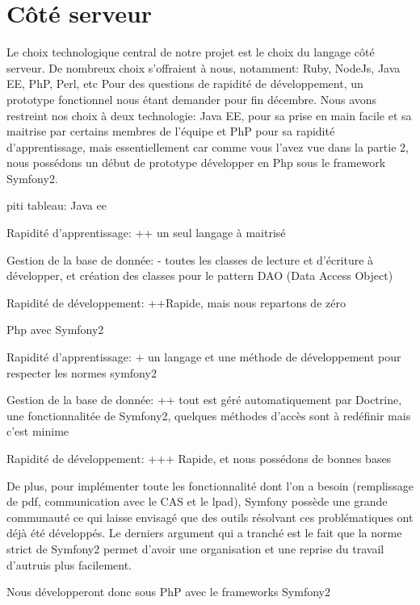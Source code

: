 \section{Côté serveur}
Le choix technologique central de notre projet est le choix du langage côté serveur. De nombreux choix s'offraient à nous, notamment: Ruby, NodeJs, Java EE, PhP, Perl, etc
Pour des questions de rapidité de développement, un prototype fonctionnel nous étant demander pour fin décembre. Nous avons restreint nos choix à deux technologie: Java EE, pour sa prise en main facile et sa maitrise par certains membres de l'équipe et PhP pour sa rapidité d'apprentissage, mais essentiellement car comme vous l'avez vue dans la partie 2, nous possédons un début de prototype développer en Php sous le framework Symfony2.

piti tableau:
Java ee 
                       
Rapidité d'apprentissage:     ++ un seul langage à maitrisé  
 
Gestion de la base de donnée:  - toutes les classes de lecture et d'écriture à développer, et création des classes pour le pattern DAO (Data Access Object) 

Rapidité de développement: ++Rapide, mais nous repartons de zéro


Php avec Symfony2
  
Rapidité d'apprentissage:   + un langage et une méthode de développement pour respecter les normes symfony2

Gestion de la base de donnée:  ++ tout est géré automatiquement par Doctrine, une fonctionnalitée de Symfony2, quelques méthodes d'accès sont à redéfinir mais c'est minime

Rapidité de développement: +++ Rapide, et nous possédons de bonnes bases

De plus, pour implémenter toute les fonctionnalité dont l'on a besoin (remplissage de pdf, communication avec le CAS et le lpad), Symfony possède une grande communauté ce qui laisse envisagé que des outils résolvant ces problématiques ont déjà été développés.
Le derniers argument qui a tranché est le fait que la norme strict de Symfony2 permet d'avoir une organisation et une reprise du travail d'autruis plus facilement.

Nous développeront donc sous PhP avec le frameworks Symfony2